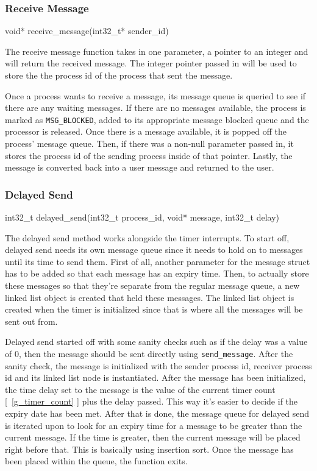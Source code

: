 \documentclass[se]{uw-wkrpt}
\begin{document}
\subsubsection{Receive Message}

\begin{code}
void* receive_message(int32_t* sender_id)
\end{code}

The receive message function takes in one parameter, a pointer to an integer and will return the received message. The integer pointer passed in will be used to store the the process id of the process that sent the message. 

Once a process wants to receive a message, its message queue is queried to see if there are any waiting messages. If there are no messages available, the process is marked as \texttt{MSG\_BLOCKED}, added to its appropriate message blocked queue and the processor is released. Once there is a message available, it is popped off the process' message queue. Then, if there was a non-null parameter passed in, it stores the process id of the sending process inside of that pointer. Lastly, the message is converted back into a user message and returned to the user.

\subsubsection{Delayed Send}

\begin{code}
int32_t delayed_send(int32_t process_id, void* message, int32_t delay)
\end{code}

The delayed send method works alongside the timer interrupts. To start off, delayed send needs its own message queue since it needs to hold on to messages until its time to send them. First of all, another parameter for the message struct has to be added so that each message has an expiry time. Then, to actually store these messages so that they're separate from the regular message queue, a new linked list object is created that held these messages. The linked list object is created when the timer is initialized since that is where all the messages will be sent out from.

Delayed send started off with some sanity checks such as if the delay was a value of 0, then the message should be sent directly using \texttt{send\_message}. After the sanity check, the message is initialized with the sender process id, receiver process id and its linked list node is instantiated. After the message has been initialized, the time delay set to the message is the value of the current timer count [~\ref{g_timer_count} ] plus the delay passed. This way it's easier to decide if the expiry date has been met. After that is done, the message queue for delayed send is iterated upon to look for an expiry time for a message to be greater than the current message. If the time is greater, then the current message will be placed right before that. This is basically using insertion sort. Once the message has been placed within the queue, the function exits. 
\end{document}
